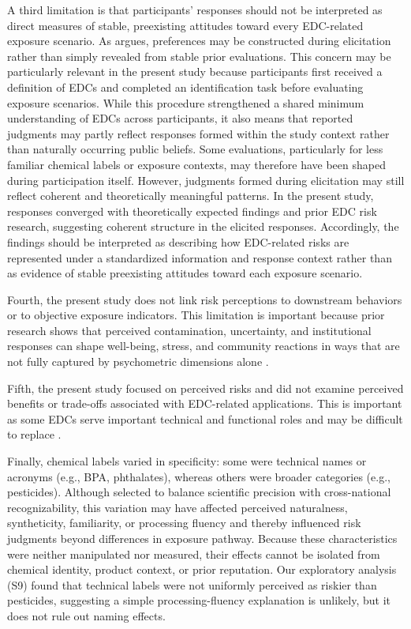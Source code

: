 A third limitation is that participants' responses should not be interpreted as direct measures of stable, preexisting attitudes toward every EDC-related exposure scenario. As \citet{slovic1995construction} argues, preferences may be constructed during elicitation rather than simply revealed from stable prior evaluations. This concern may be particularly relevant in the present study because participants first received a definition of EDCs and completed an identification task before evaluating exposure scenarios. While this procedure strengthened a shared minimum understanding of EDCs across participants, it also means that reported judgments may partly reflect responses formed within the study context rather than naturally occurring public beliefs. Some evaluations, particularly for less familiar chemical labels or exposure contexts, may therefore have been shaped during participation itself. However, judgments formed during elicitation may still reflect coherent and theoretically meaningful patterns. In the present study, responses converged with theoretically expected findings and prior EDC risk research, suggesting coherent structure in the elicited responses. Accordingly, the findings should be interpreted as describing how EDC-related risks are represented under a standardized information and response context rather than as evidence of stable preexisting attitudes toward each exposure scenario. 

Fourth, the present study does not link risk perceptions to downstream behaviors or to objective exposure indicators. This limitation is important because prior research shows that perceived contamination, uncertainty, and institutional responses can shape well-being, stress, and community reactions in ways that are not fully captured by psychometric dimensions alone \citep{wakefield2000environmental, sullivan2021chronic}. 

Fifth, the present study focused on perceived risks and did not examine perceived benefits or trade-offs associated with EDC-related applications. This is important as some EDCs serve important technical and functional roles and may be difficult to replace \citep{cousins2019concept,jacobs2015alternatives}.

Finally, chemical labels varied in specificity: some were technical names or acronyms (e.g., BPA, phthalates), whereas others were broader categories (e.g., pesticides). Although selected to balance scientific precision with cross-national recognizability, this variation may have affected perceived naturalness, syntheticity, familiarity, or processing fluency and thereby influenced risk judgments beyond differences in exposure pathway. Because these characteristics were neither manipulated nor measured, their effects cannot be isolated from chemical identity, product context, or prior reputation. Our exploratory analysis (S9) found that technical labels were not uniformly perceived as riskier than pesticides, suggesting a simple processing-fluency explanation is unlikely, but it does not rule out naming effects.

